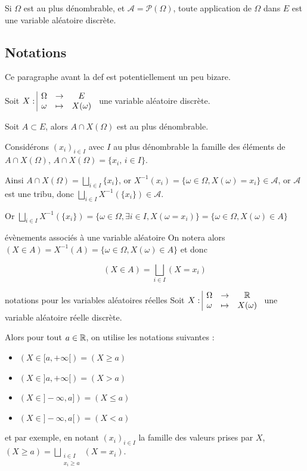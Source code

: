 \begin{remarque}
    Si $\Omega$ est au plus dénombrable, et $\mathcal A = \mathscr P(\Omega)$, toute application 
    de $\Omega$ dans $E$ est une variable aléatoire discrète.
\end{remarque}

\subsection{Notations}

Ce paragraphe avant la def est potentiellement un peu bizare.

Soit $X: \space \begin{array}{|ccc} \displaystyle \Omega & \to & \displaystyle E \\ \displaystyle \omega & \mapsto & \displaystyle X(\omega) \end{array}$ une variable aléatoire discrète.

Soit $A \subset E$, alors $A \cap X(\Omega)$ est au plus dénombrable. 

Considérons $(x_i)_{i \in I}$ avec $I$ au plus dénombrable la famille des éléments 
de $A \cap X(\Omega)$, $A \cap X(\Omega) = \{x_i, \, i \in I\}$.

Ainsi $A \cap X(\Omega) = \bigsqcup_{i \in I} \{x_i\}$, or 
$X^{-1}({x_i}) = \{\omega \in \Omega, X(\omega) = x_i\} \in \mathcal A$, or $\mathcal A$
est une tribu, donc $\displaystyle \bigsqcup_{i \in I} X^{-1}(\{x_i\}) \in \mathcal A$.

Or $\bigsqcup_{i \in I} X^{-1}(\{x_i\}) = \{\omega \in \Omega, \exists i \in I, X(\omega = x_i)\} = \{\omega \in \Omega, X(\omega) \in A\}$


\begin{definition}{évènements associés à une variable aléatoire}{}
    On notera alors $(X \in A) = X^{-1}(A) = \{\omega \in \Omega, X(\omega) \in A\}$ et donc 

    $$\displaystyle (X \in A) = \bigsqcup_{i \in I} (X = x_i)$$
    
\end{definition}

\begin{definition}{notations pour les variables aléatoires réelles}{}
    Soit $X: \space \begin{array}{|ccc} \displaystyle \Omega & \to & \displaystyle \mathbb{R} \\ \displaystyle \omega & \mapsto & \displaystyle X(\omega) \end{array}$ une variable aléatoire réelle discrète.

    Alors pour tout $a \in \mathbb{R}$, on utilise les notations suivantes : 

    \begin{itemize}
        \item $(X \in [a, + \infty[) = (X \geqslant a)$
        \item $(X \in ]a, + \infty[) = (X > a)$
        \item $(X \in ]-\infty, a]) = (X \leqslant a)$
        \item $(X \in ]-\infty, a[) = (X < a)$
    \end{itemize}

    et par exemple, en notant $(x_i)_{i \in I}$ la famille des valeurs prises par $X$, 
    $\displaystyle (X \geqslant a) = \bigsqcup_{\substack{i \in I \\ x_i \geqslant a}} (X = x_i)$.
\end{definition}

